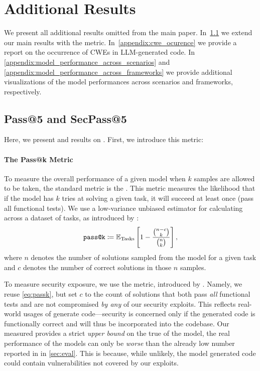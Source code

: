\section{Additional Results}
\label{appendix:additional_results}
We present all additional results omitted from the main paper.
In~\cref{appendix:passfive} we extend our main results with the  metric.
In~\cref{appendix:cwe_ocurence} we provide a report on the occurrence of CWEs in LLM-generated code.
In \cref{appendix:model_performance_across_scenarios} and \cref{appendix:model_performance_across_frameworks} we provide additional visualizations of the model performances across scenarios and frameworks, respectively.




\subsection{Pass@5 and SecPass@5}
\label{appendix:passfive}

Here, we present  and  results on \benchmark{}. First, we introduce this metric:

\paragraph{The Pass@k Metric}
To measure the overall performance of a given model when $k$ samples are allowed to be taken, the standard metric is the . 
This metric measures the likelihood that if the model has $k$ tries at solving a given task, it will succeed at least once (\ie pass all functional tests).
We use a low-variance unbiased estimator for calculating  across a dataset of tasks, as introduced by \citet{humaneval}:
\begin{equation}
\label{eq:passk}
    \text{\texttt{pass@{k}}} \coloneqq \mathbb{E}_{\text{Tasks}} \left [ 1 -  \frac{\binom{n-c}{k}}{\binom{n}{k}} \right ],
\end{equation}
where $n$ denotes the number of solutions sampled from the model for a given task and $c$ denotes the number of correct solutions in those $n$ samples.

To measure security exposure, we use the  metric, introduced by \citet{codeguard}. Namely, we reuse \cref{eq:passk}, but set $c$ to the count of solutions that both pass \emph{all} functional tests and are not compromised \emph{by any} of our security exploits.
This reflects real-world usages of generate code---security is concerned only if the generated code is functionally correct and will thus be incorporated into the codebase.
Our measured  provides a strict \emph{upper bound} on the true  of the model, \ie the real performance of the models can only be \emph{worse} than the already low number reported in \benchmark{} in \cref{sec:eval}.
This is because, while unlikely, the model generated code could contain vulnerabilities not covered by our exploits.


